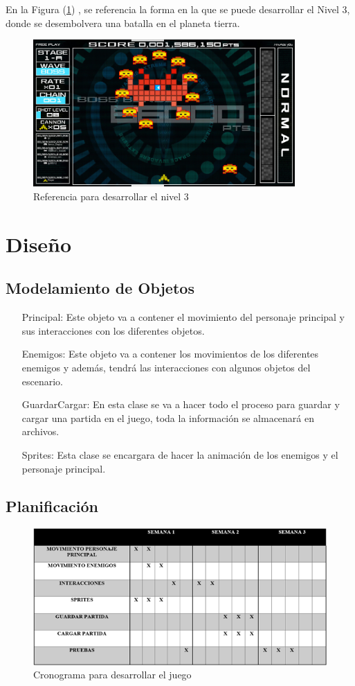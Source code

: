 \documentclass{article}
\begin{document}
En la Figura (\ref{fig:nivel3}) \cite{invaders} , se referencia la forma en la que se puede desarrollar el Nivel 3, donde se desembolvera una batalla en el planeta tierra.

\begin{figure}[h]
\includegraphics[width=10cm]{Imagenes/NIvel 3.jpg}
\centering
\caption{Referencia para desarrollar el nivel 3}
\label{fig:nivel3}
\end{figure}

\newpage
\section{Diseño} \label{diseño}
\subsection{Modelamiento de Objetos}
\begin{enumerate}
    \item[Principal:] Este objeto va a contener el movimiento del personaje principal y sus interacciones con los diferentes objetos.
    \item[Enemigos:] Este objeto va a contener los movimientos de los diferentes enemigos y además, tendrá las interacciones con algunos objetos del escenario.
    \item[GuardarCargar: ] En esta clase se va a hacer todo el proceso para guardar y cargar una partida en el juego, toda la información se almacenará en archivos.
    \item[Sprites: ] Esta clase se encargara de hacer la animación de los enemigos y el personaje principal.
    
\end{enumerate}
\subsection{Planificación}
\begin{figure}[h]
\includegraphics[width=15cm]{Imagenes/Cronograma.png}
\centering
\caption{Cronograma para desarrollar el juego}
\label{fig:cronograma}
\end{figure}


\newpage



\end{document}
